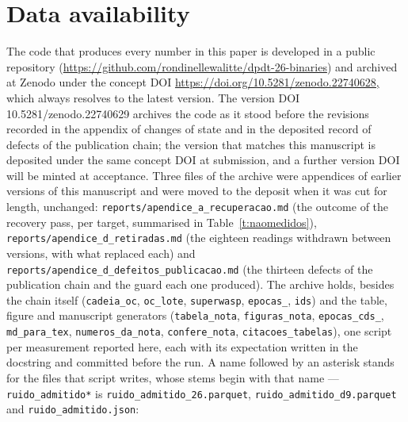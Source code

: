 \documentclass{aa}
\begin{document}
\section{Data availability}\label{s:avail}
\begin{sloppypar}
The code that produces every number in this paper is developed in a public repository (\url{https://github.com/rondinellewalitte/dpdt-26-binaries}) and archived at Zenodo under the concept DOI \url{https://doi.org/10.5281/zenodo.22740628,} which always resolves to the latest version. The version DOI 10.5281/zenodo.22740629 archives the code as it stood before the revisions recorded in the appendix of changes of state and in the deposited record of defects of the publication chain; the version that matches this manuscript is deposited under the same concept DOI at submission, and a further version DOI will be minted at acceptance. Three files of the archive were appendices of earlier versions of this manuscript and were moved to the deposit when it was cut for length, unchanged: \texttt{reports/apendice\_\allowbreak a\_\allowbreak recuperacao.md} (the outcome of the recovery pass, per target, summarised in Table~\ref{t:naomedidos}), \texttt{reports/apendice\_\allowbreak d\_\allowbreak retiradas.md} (the eighteen readings withdrawn between versions, with what replaced each) and \texttt{reports/apendice\_\allowbreak d\_\allowbreak defeitos\_\allowbreak publicacao.md} (the thirteen defects of the publication chain and the guard each one produced). The archive holds, besides the chain itself (\texttt{cadeia\_\allowbreak oc}, \texttt{oc\_\allowbreak lote}, \texttt{superwasp}, \texttt{epocas\_}, \texttt{ids}) and the table, figure and manuscript generators (\texttt{tabela\_\allowbreak nota}, \texttt{figuras\_\allowbreak nota}, \texttt{epocas\_\allowbreak cds\_}, \texttt{md\_\allowbreak para\_\allowbreak tex}, \texttt{numeros\_\allowbreak da\_\allowbreak nota}, \texttt{confere\_\allowbreak nota}, \texttt{citacoes\_\allowbreak tabelas}), one script per measurement reported here, each with its expectation written in the docstring and committed before the run. A name followed by an asterisk stands for the files that script writes, whose stems begin with that name --- \texttt{ruido\_\allowbreak admitido*} is \texttt{ruido\_\allowbreak admitido\_\allowbreak 26.parquet}, \texttt{ruido\_\allowbreak admitido\_\allowbreak d9.parquet} and \texttt{ruido\_\allowbreak admitido.json}:


\end{sloppypar}
\end{document}
